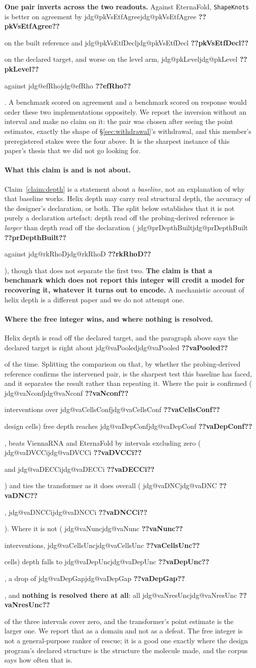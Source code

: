 \documentclass[11pt]{article}
\makeatletter
\newcommand{\jdg}[1]{%
  \ifcsname jdg@#1\endcsname\csname jdg@#1\endcsname
  \else\textbf{??#1??}\PackageError{nm}{undefined measured quantity #1}{}\fi}
\makeatother
\begin{document}
\textbf{One pair inverts across the two readouts.} Against EternaFold, \texttt{ShapeKnots} is
better on agreement by \jdg{pkVsEtfAgree} on the built reference and \jdg{pkVsEtfDecl} on the
declared target, and worse on the level arm, \jdg{pkLevel} against \jdg{efRho}. A benchmark
scored on agreement and a benchmark scored on response would order these two implementations
oppositely. We report the inversion without an interval and make no claim on it: the pair was chosen after
seeing the point estimates, exactly the shape of \S\ref{sec:withdrawal}'s withdrawal, and this
member's preregistered stakes were the four above. It is the sharpest instance of this paper's thesis that we did not go looking for.

\paragraph{What this claim is and is not about.} Claim~\ref{claim:depth} is a statement about a
\emph{baseline}, not an explanation of why that baseline works. Helix depth may carry real structural depth, the accuracy of the designer's declaration, or both.
The split below establishes that it is not purely a declaration artefact: depth read off the
probing-derived reference is \emph{larger} than depth read off the declaration (\jdg{prDepthBuilt}
against \jdg{rkRhoD}), though that does not separate the first two. \textbf{The claim is that a benchmark which
does not report this integer will credit a model for recovering it, whatever it turns out to
encode.} A mechanistic account of helix depth is a different paper and we do not attempt one.

\paragraph{Where the free integer wins, and where nothing is resolved.} Helix depth is read off
the declared target, and the paragraph above says the declared target is right about
\jdg{vaPooled} of the time. Splitting the comparison on that, by whether the probing-derived reference confirms the intervened
pair, is the sharpest test this baseline has faced, and it separates the result rather than
repeating it. Where the pair is confirmed
(\jdg{vaNconf} interventions over \jdg{vaCellsConf} design cells) free depth reaches
\jdg{vaDepConf}, beats ViennaRNA and EternaFold by intervals excluding zero
(\jdg{vaDVCCi} and \jdg{vaDECCi}) and ties the transformer as it does overall
(\jdg{vaDNC}, \jdg{vaDNCCi}). Where it is not (\jdg{vaNunc} interventions, \jdg{vaCellsUnc}
cells) depth falls to \jdg{vaDepUnc}, a drop of \jdg{vaDepGap}, and \textbf{nothing is resolved
there at all}: all \jdg{vaNresUnc} of the three intervals cover zero, and the transformer's point
estimate is the larger one. We report that as a domain and not as a defeat. The free integer is
not a general-purpose ranker of rescue; it is a good one exactly where the design program's
declared structure is the structure the molecule made, and the corpus says how often that is.
\end{document}
